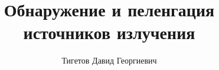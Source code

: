 \documentclass[a4paper,12pt]{report}
\begin{document}
\title{Обнаружение и пеленгация источников излучения}
\author{Тигетов Давид Георгиевич}
\maketitle

\tableofcontents




\end{document}

